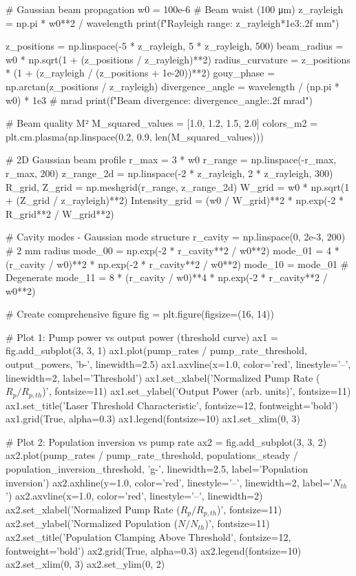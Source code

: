 \documentclass[a4paper, 11pt]{article}
\begin{document}
\begin{pycode}
# Gaussian beam propagation
w0 = 100e-6  # Beam waist (100 μm)
z_rayleigh = np.pi * w0**2 / wavelength
print(f"Rayleigh range: {z_rayleigh*1e3:.2f} mm")

z_positions = np.linspace(-5 * z_rayleigh, 5 * z_rayleigh, 500)
beam_radius = w0 * np.sqrt(1 + (z_positions / z_rayleigh)**2)
radius_curvature = z_positions * (1 + (z_rayleigh / (z_positions + 1e-20))**2)
gouy_phase = np.arctan(z_positions / z_rayleigh)
divergence_angle = wavelength / (np.pi * w0) * 1e3  # mrad
print(f"Beam divergence: {divergence_angle:.2f} mrad")

# Beam quality M²
M_squared_values = [1.0, 1.2, 1.5, 2.0]
colors_m2 = plt.cm.plasma(np.linspace(0.2, 0.9, len(M_squared_values)))

# 2D Gaussian beam profile
r_max = 3 * w0
r_range = np.linspace(-r_max, r_max, 200)
z_range_2d = np.linspace(-2 * z_rayleigh, 2 * z_rayleigh, 300)
R_grid, Z_grid = np.meshgrid(r_range, z_range_2d)
W_grid = w0 * np.sqrt(1 + (Z_grid / z_rayleigh)**2)
Intensity_grid = (w0 / W_grid)**2 * np.exp(-2 * R_grid**2 / W_grid**2)

# Cavity modes - Gaussian mode structure
r_cavity = np.linspace(0, 2e-3, 200)  # 2 mm radius
mode_00 = np.exp(-2 * r_cavity**2 / w0**2)
mode_01 = 4 * (r_cavity / w0)**2 * np.exp(-2 * r_cavity**2 / w0**2)
mode_10 = mode_01  # Degenerate
mode_11 = 8 * (r_cavity / w0)**4 * np.exp(-2 * r_cavity**2 / w0**2)

# Create comprehensive figure
fig = plt.figure(figsize=(16, 14))

# Plot 1: Pump power vs output power (threshold curve)
ax1 = fig.add_subplot(3, 3, 1)
ax1.plot(pump_rates / pump_rate_threshold, output_powers, 'b-', linewidth=2.5)
ax1.axvline(x=1.0, color='red', linestyle='--', linewidth=2, label='Threshold')
ax1.set_xlabel('Normalized Pump Rate ($R_p / R_{p,th}$)', fontsize=11)
ax1.set_ylabel('Output Power (arb. units)', fontsize=11)
ax1.set_title('Laser Threshold Characteristic', fontsize=12, fontweight='bold')
ax1.grid(True, alpha=0.3)
ax1.legend(fontsize=10)
ax1.set_xlim(0, 3)

# Plot 2: Population inversion vs pump rate
ax2 = fig.add_subplot(3, 3, 2)
ax2.plot(pump_rates / pump_rate_threshold, populations_steady / population_inversion_threshold,
         'g-', linewidth=2.5, label='Population inversion')
ax2.axhline(y=1.0, color='red', linestyle='--', linewidth=2, label='$N_{th}$')
ax2.axvline(x=1.0, color='red', linestyle='--', linewidth=2)
ax2.set_xlabel('Normalized Pump Rate ($R_p / R_{p,th}$)', fontsize=11)
ax2.set_ylabel('Normalized Population ($N / N_{th}$)', fontsize=11)
ax2.set_title('Population Clamping Above Threshold', fontsize=12, fontweight='bold')
ax2.grid(True, alpha=0.3)
ax2.legend(fontsize=10)
ax2.set_xlim(0, 3)
ax2.set_ylim(0, 2)


\end{pycode}
\end{document}
